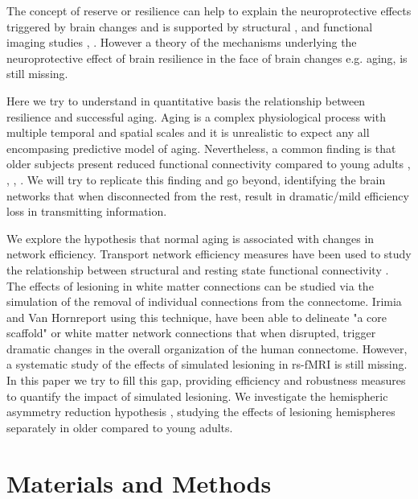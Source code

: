 \documentclass[12pt,a4paper]{article}
\begin{document}
The concept of reserve or resilience can help to explain the neuroprotective effects triggered by brain changes and is supported by structural \citep{sole-padulles_brain_2009}, \citep{bartres-faz_structural_2011} and functional imaging studies \citep{stern_brain_2005}, \citep{jellinger_neuropathological_2013}. However a theory of the mechanisms underlying the neuroprotective effect of brain resilience in the face of brain changes e.g. aging, is still missing. 

Here we try to understand in quantitative basis the relationship between resilience and successful aging. Aging is a complex physiological process with multiple temporal and spatial scales and it is unrealistic to expect any all encompasing predictive model of aging. Nevertheless, a common finding is that older subjects present reduced functional connectivity compared to young adults \citep{andrews-hanna_disruption_2007}, \citep{st_jacques_effects_2010},  \citep{sambataro_age-related_2010}, \citep{campbell_age_2013}. We will try to replicate this finding and go beyond, identifying the brain networks that when disconnected from the rest, result in dramatic/mild efficiency loss in transmitting information. 

We explore the hypothesis that normal aging is associated with changes in network efficiency. %
Transport network efficiency measures have been used to study the relationship between structural and resting state functional connectivity \citep{goni_resting-brain_2014}. 
The effects of lesioning in white matter connections can be studied via the simulation of the removal of individual connections from the connectome. Irimia and Van Hornreport \citep{irimia_systematic_2014} using this technique, have been able to delineate "a core scaffold" or white matter network connections that when disrupted, trigger dramatic changes in the overall organization of the human connectome. However, a systematic study of the effects of simulated lesioning in rs-fMRI is still missing. 
In this paper we try to fill this gap, providing efficiency and robustness measures to quantify the impact of simulated lesioning. We investigate the hemispheric asymmetry reduction hypothesis \citep{cabeza_aging_2002}, studying the effects of lesioning hemispheres separately in older compared to young adults.  

\section{Materials and Methods}
\label{mat-methods}
\end{document}
